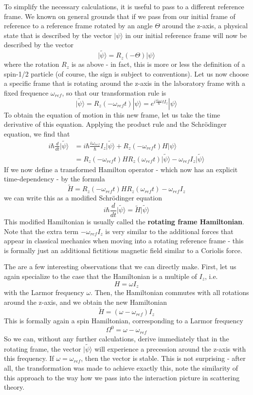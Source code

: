 \documentclass[a4paper, draft]{article}
\theoremstyle{own}
\theoremstyle{remark}
\begin{document}
To simplify the necessary calculations, it is useful to pass to a different reference frame. We known on general grounds that if we pass from our initial frame of reference to a reference frame rotated by an angle $\Theta$ around the z-axis, a physical state that is described by the vector $|\psi \rangle$ in our initial reference frame will now be described by the vector
$$
\widetilde{|\psi\rangle} = R_z(-\Theta) |\psi \rangle
$$ 
where the rotation $R_z$ is as above - in fact, this is more or less the definition of a spin-1/2 particle (of course, the sign is subject to conventions). Let us now choose a specific frame that is rotating around the z-axis in the laboratory frame with a fixed frequence $\omega_{ref}$, so that our transformation rule is
$$
\widetilde{|\psi\rangle} = R_z(-\omega_{ref} t) |\psi \rangle = e^{i\frac{\omega_{ref}}{\hbar}t I_z} |\psi \rangle
$$ 
To obtain the equation of motion in this new frame, let us take the time derivative of this equation. Applying the product rule and the Schr\"odinger equation, we find that
\begin{align*}
i \hbar \frac{d}{dt} \widetilde{|\psi\rangle} &= 
i\hbar \frac{i \omega_{ref}}{\hbar} I_z \widetilde{|\psi\rangle} + 
R_z(-\omega_{ref} t) H |\psi \rangle \\
&= R_z(-\omega_{ref}t ) H R_z(\omega_{ref}t ) \widetilde{|\psi\rangle} - \omega_{ref}  I_z  \widetilde{|\psi\rangle}
\end{align*}
If we now define a transformed Hamilton operator - which now has an explicit time-dependency - by the formula
$$
\widetilde{H} = R_z(-\omega_{ref}t ) H R_z(\omega_{ref}t ) - \omega_{ref}  I_z
$$
we can write this as a modified Schr\"odinger equation
$$
i \hbar \frac{d}{dt} \widetilde{|\psi\rangle} = \widetilde{H} \widetilde{|\psi\rangle}
$$
This modified Hamiltonian is usually called the {\bf rotating frame Hamiltonian}. Note that the extra term $ - \omega_{ref}  I_z$ is very similar to the additional forces that appear in classical mechanics when moving into a rotating reference frame - this is formally just an additional fictitious magnetic field similar to a Coriolis force. 

The are a few interesting observations that we can directly make. First, let us again specialize to the case that the Hamiltonian is a multiple of $I_z$, i.e. 
$$
H = \omega I_z
$$
with the Larmor frequency $\omega$. Then, the Hamiltonian commutes with all rotations around the z-axis, and we obtain the new Hamiltonian
$$
\widetilde{H} = (\omega - \omega_{ref}) I_z
$$
This is formally again a spin Hamiltonian, corresponding to a Larmor frequency 
$$
\Omega^0 = \omega - \omega_{ref}
$$
So we can, without any further calculations, derive immediately that in the rotating frame, the vector $\widetilde{|\psi\rangle}$ will experience a precession around the z-axis with this frequency. If $\omega = \omega_{ref}$, then the vector is stable. This is not surprising - after all, the transformation was made to achieve  exactly this, note the similarity of this approach to the way how we pass into the interaction picture in scattering theory. 
\end{document}
